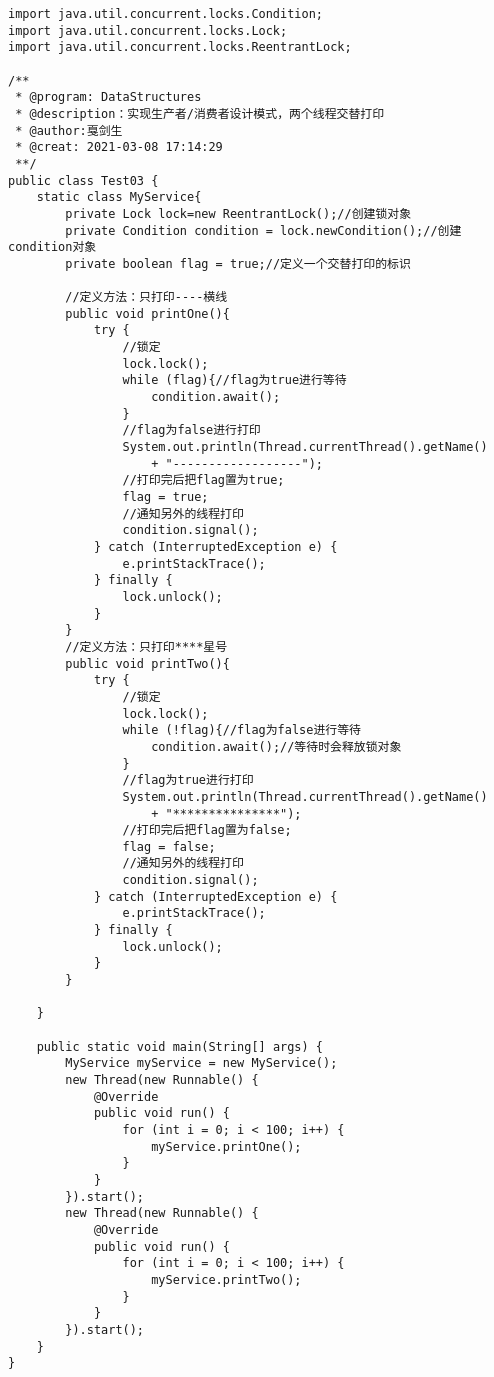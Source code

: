 \documentclass[a4paper]{report}
\begin{document}
\begin{Verbatim}[frame=single,numbersep=5pt,xleftmargin=1.5em,xrightmargin=1.5em]
import java.util.concurrent.locks.Condition;
import java.util.concurrent.locks.Lock;
import java.util.concurrent.locks.ReentrantLock;

/**
 * @program: DataStructures
 * @description：实现生产者/消费者设计模式，两个线程交替打印
 * @author:戛剑生
 * @creat: 2021-03-08 17:14:29
 **/
public class Test03 {
    static class MyService{
        private Lock lock=new ReentrantLock();//创建锁对象
        private Condition condition = lock.newCondition();//创建condition对象
        private boolean flag = true;//定义一个交替打印的标识

        //定义方法：只打印----横线
        public void printOne(){
            try {
                //锁定
                lock.lock();
                while (flag){//flag为true进行等待
                    condition.await();
                }
                //flag为false进行打印
                System.out.println(Thread.currentThread().getName()
                    + "------------------");
                //打印完后把flag置为true;
                flag = true;
                //通知另外的线程打印
                condition.signal();
            } catch (InterruptedException e) {
                e.printStackTrace();
            } finally {
                lock.unlock();
            }
        }
        //定义方法：只打印****星号
        public void printTwo(){
            try {
                //锁定
                lock.lock();
                while (!flag){//flag为false进行等待
                    condition.await();//等待时会释放锁对象
                }
                //flag为true进行打印
                System.out.println(Thread.currentThread().getName()
                    + "***************");
                //打印完后把flag置为false;
                flag = false;
                //通知另外的线程打印
                condition.signal();
            } catch (InterruptedException e) {
                e.printStackTrace();
            } finally {
                lock.unlock();
            }
        }

    }

    public static void main(String[] args) {
        MyService myService = new MyService();
        new Thread(new Runnable() {
            @Override
            public void run() {
                for (int i = 0; i < 100; i++) {
                    myService.printOne();
                }
            }
        }).start();
        new Thread(new Runnable() {
            @Override
            public void run() {
                for (int i = 0; i < 100; i++) {
                    myService.printTwo();
                }
            }
        }).start();
    }
}\end{Verbatim}
\end{document}
